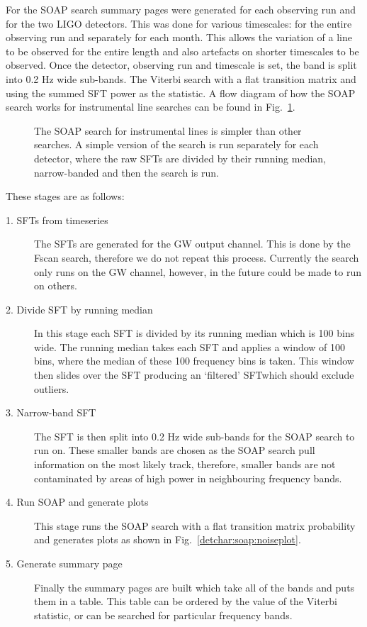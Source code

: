 For the SOAP search summary pages were generated for each observing run and for the two \ac{LIGO} detectors. 
This was done for various timescales: for the entire observing run and separately for each month.
This allows the variation of a line to be observed for the entire length and also artefacts on shorter timescales to be observed.
Once the detector, observing run and timescale is set, the band is split into 0.2 Hz wide sub-bands. 
The Viterbi search with a flat transition matrix and using the summed \ac{SFT} power as the statistic.
A flow diagram of how the SOAP search works for instrumental line searches can be found in Fig.~\ref{detchar:summary:flow}.
%
%
\begin{figure}[hp]
	\centering
	
	
	\caption{\label{detchar:summary:flow} The SOAP search for instrumental lines is simpler than other searches. A simple version of the search is run separately for each detector, where the raw \acp{SFT} are divided by their running median, narrow-banded and then the search is run. }
	
\end{figure} 
These stages are as follows:
\begin{description}
	\item[1. \acp{SFT} from timeseries] The \acp{SFT} are generated for the \ac{GW} output channel. This is done by the Fscan search, therefore we do not repeat this process. Currently the search only runs on the \ac{GW} channel, however, in the future could be made to run on others.
	
	\item[2. Divide \ac{SFT} by running median] In this stage each \ac{SFT} is divided by its running median which is 100 bins wide. The running median takes each \ac{SFT} and applies a window of 100 bins, where the median of these 100 frequency bins is taken. This window then slides over the \ac{SFT} producing an `filtered' \ac{SFT}which should exclude outliers.
	
	\item[3. Narrow-band \ac{SFT}] The \ac{SFT} is then split into 0.2 Hz wide sub-bands for the SOAP search to run on. These smaller bands are chosen as the SOAP search pull information on the most likely track, therefore, smaller bands are not contaminated by areas of high power in neighbouring frequency bands. 
	
	\item[4. Run SOAP and generate plots] This stage runs the SOAP search with a flat transition matrix probability and generates plots as shown in Fig.~\ref{detchar:soap:noiseplot}.
	
	\item[5. Generate summary page] Finally the summary pages are built which take all of the bands and puts them in a table. This table can be ordered by the value of the Viterbi statistic, or can be searched for particular frequency bands. 
\end{description}

